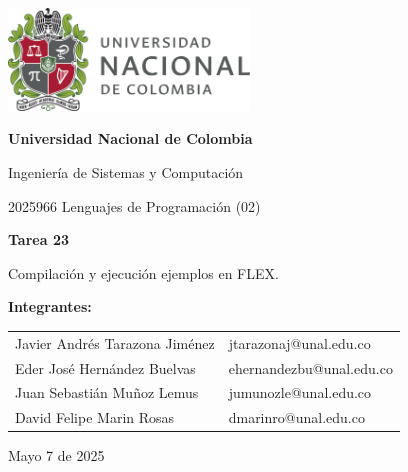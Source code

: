 \documentclass{article}
\begin{document}
\begin{titlepage}
    \centering
    \includegraphics[width=0.48\textwidth]{logo_universidad.png}
    \par\vspace{2cm}

    {\Large \textbf{Universidad Nacional de Colombia} \par}
    \vspace{0.5cm}
    {\large Ingeniería de Sistemas y Computación \par}
    {\large 2025966 Lenguajes de Programación (02)\par}
    \vspace{3cm}

    {\large \textbf{Tarea 23} \par}
    {\large Compilación y ejecución ejemplos en FLEX.\par}
    \vspace{3cm}

    {\large \textbf{Integrantes:} \par}
    \vspace{0.5cm}
    \begin{tabular}{ll}
    Javier Andrés Tarazona Jiménez & jtarazonaj@unal.edu.co \\
    Eder  José Hernández Buelvas   & ehernandezbu@unal.edu.co \\
    Juan Sebastián Muñoz Lemus     & jumunozle@unal.edu.co   \\
    David Felipe Marin Rosas       & dmarinro@unal.edu.co   \\
    \end{tabular}
    \par\vspace{3cm}

    {\large Mayo 7 de 2025 \par}
\end{titlepage}

\tableofcontents %

\newpage %
\end{document}
